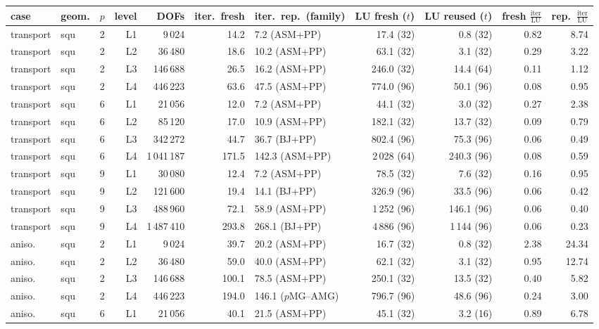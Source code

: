\begin{tabular}{llrrrrlrrrr}
\toprule
case & geom. & $p$ & level & DOFs & iter.\ fresh & iter.\ rep.\ (family) & LU fresh ($t$) & LU reused ($t$) & fresh $\frac{\mathrm{iter}}{\mathrm{LU}}$ & rep.\ $\frac{\mathrm{iter}}{\mathrm{LU}}$\\
\midrule
transport & squ & 2 & L1 & 9\,024 & 14.2 & 7.2 (ASM+PP) & 17.4 (32) & 0.8 (32) & 0.82 & 8.74\\
transport & squ & 2 & L2 & 36\,480 & 18.6 & 10.2 (ASM+PP) & 63.1 (32) & 3.1 (32) & 0.29 & 3.22\\
transport & squ & 2 & L3 & 146\,688 & 26.5 & 16.2 (ASM+PP) & 246.0 (32) & 14.4 (64) & 0.11 & 1.12\\
transport & squ & 2 & L4 & 446\,223 & 63.6 & 47.5 (ASM+PP) & 774.0 (96) & 50.1 (96) & 0.08 & 0.95\\
transport & squ & 6 & L1 & 21\,056 & 12.0 & 7.2 (ASM+PP) & 44.1 (32) & 3.0 (32) & 0.27 & 2.38\\
transport & squ & 6 & L2 & 85\,120 & 17.0 & 10.9 (ASM+PP) & 182.1 (32) & 13.7 (32) & 0.09 & 0.79\\
transport & squ & 6 & L3 & 342\,272 & 44.7 & 36.7 (BJ+PP) & 802.4 (96) & 75.3 (96) & 0.06 & 0.49\\
transport & squ & 6 & L4 & 1\,041\,187 & 171.5 & 142.3 (ASM+PP) & 2\,028 (64) & 240.3 (96) & 0.08 & 0.59\\
transport & squ & 9 & L1 & 30\,080 & 12.4 & 7.2 (ASM+PP) & 78.5 (32) & 7.6 (32) & 0.16 & 0.95\\
transport & squ & 9 & L2 & 121\,600 & 19.4 & 14.1 (BJ+PP) & 326.9 (96) & 33.5 (96) & 0.06 & 0.42\\
transport & squ & 9 & L3 & 488\,960 & 72.1 & 58.9 (ASM+PP) & 1\,252 (96) & 146.1 (96) & 0.06 & 0.40\\
transport & squ & 9 & L4 & 1\,487\,410 & 293.8 & 268.1 (BJ+PP) & 4\,886 (96) & 1\,144 (96) & 0.06 & 0.23\\
aniso. & squ & 2 & L1 & 9\,024 & 39.7 & 20.2 (ASM+PP) & 16.7 (32) & 0.8 (32) & 2.38 & 24.34\\
aniso. & squ & 2 & L2 & 36\,480 & 59.0 & 40.0 (ASM+PP) & 62.1 (32) & 3.1 (32) & 0.95 & 12.74\\
aniso. & squ & 2 & L3 & 146\,688 & 100.1 & 78.5 (ASM+PP) & 250.1 (32) & 13.5 (32) & 0.40 & 5.82\\
aniso. & squ & 2 & L4 & 446\,223 & 194.0 & 146.1 ($p$MG--AMG) & 796.7 (96) & 48.6 (96) & 0.24 & 3.00\\
aniso. & squ & 6 & L1 & 21\,056 & 40.1 & 21.5 (ASM+PP) & 45.1 (32) & 3.2 (16) & 0.89 & 6.78\\

\end{tabular}
